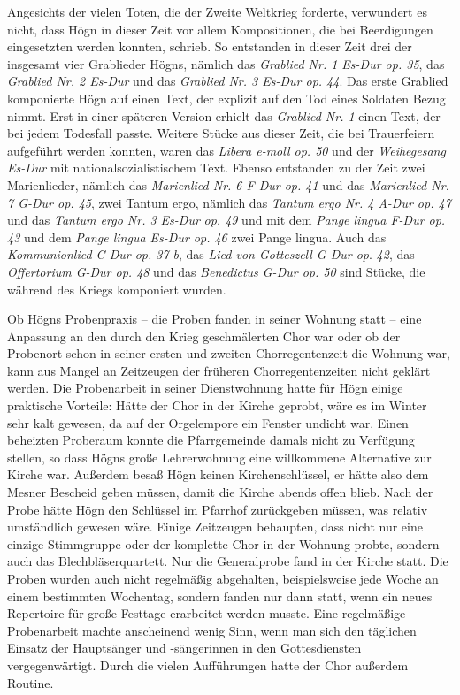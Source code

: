 \documentclass{book}
\begin{document}
Angesichts der vielen Toten, die der Zweite Weltkrieg forderte,
verwun\-dert es nicht, dass Högn in dieser Zeit vor allem
Kompositionen, die bei Beerdigungen eingesetzten werden konnten,
schrieb. So entstanden in dieser Zeit drei der insgesamt vier
Grablieder Högns, nämlich das \textit{Grablied Nr. 1 Es-Dur op. 35},
das \textit{Grablied Nr. 2 Es-Dur} und das \textit{Grablied Nr. 3
Es-Dur op. 44}. Das erste Grablied komponierte Högn auf einen Text, der
explizit auf den Tod eines Soldaten Bezug nimmt. Erst in einer späteren
Version erhielt das \textit{Grab\-lied Nr. 1} einen Text, der bei jedem
Todesfall passte. Weitere Stücke aus dieser Zeit, die bei Trauerfeiern
aufgeführt werden konnten, waren das \textit{Libera e-moll op. 50} und
der \textit{Weihegesang Es-Dur} mit nationalsozialistischem Text.
Ebenso entstanden zu der Zeit zwei Marienlieder, nämlich das
\textit{Marienlied Nr. 6 F-Dur op. 41} und das \textit{Marienlied Nr. 7
G-Dur op. 45}, zwei Tantum ergo, nämlich das \textit{Tantum ergo Nr. 4
A-Dur op. 47} und das \textit{Tantum ergo Nr. 3 Es-Dur} \textit{op. 49}
und mit dem \textit{Pange lingua F-Dur op. 43} und dem \textit{Pange
lingua Es-Dur op. 46} zwei Pange lingua. Auch das \textit{Kommunionlied
C-Dur op. 37 b}, das \textit{Lied von Gotteszell G-Dur op}.
\textit{42}, das \textit{Offertorium G-Dur op. 48} und das
\textit{Benedictus G-Dur op. 50} sind Stücke, die während des Kriegs
komponiert wurden.

Ob Högns Probenpraxis – die Proben fanden in seiner Wohnung statt – eine
Anpassung an den durch den Krieg geschmälerten Chor war oder ob der
Probenort schon in seiner ersten und zweiten Chorregentenzeit die
Wohnung war, kann aus Mangel an Zeitzeugen der früheren
Chorregentenzeiten nicht geklärt werden. Die Probenarbeit in seiner
Dienstwohnung hatte für Högn einige praktische Vorteile: Hätte der Chor
in der Kirche geprobt, wäre es im Winter sehr kalt gewesen, da auf der
Orgelempore ein Fenster undicht war. Einen beheizten Proberaum konnte
die Pfarrgemeinde damals nicht zu Ver\-fügung stellen, so dass Högns
große Lehrerwohnung eine willkommene Al\-ternative zur Kirche war.
Außerdem besaß Högn keinen Kirchenschlüssel, er hätte also dem Mesner
Bescheid geben müssen, damit die Kirche abends of\-fen blieb. Nach der
Probe hätte Högn den Schlüssel im Pfarrhof zurückge\-ben müssen, was
relativ umständlich gewesen wäre. Einige Zeitzeugen be\-haupten, dass
nicht nur eine einzige Stimmgruppe oder der komplette Chor in der
Wohnung probte, sondern auch das Blechbläserquartett. Nur die
General\-probe fand in der Kirche statt. Die Proben wurden auch nicht
regelmäßig abgehalten, beispielsweise jede Woche an einem bestimmten
Wochentag, son\-dern fanden nur dann statt, wenn ein neues Repertoire
für große Festtage er\-arbeitet werden musste. Eine regelmäßige
Probenarbeit machte anscheinend wenig Sinn, wenn man sich den täglichen
Einsatz der Hauptsänger und -sän\-gerinnen in den Gottesdiensten
vergegenwärtigt. Durch die vielen Aufführun\-gen hatte der Chor
außerdem Routine.
\end{document}
